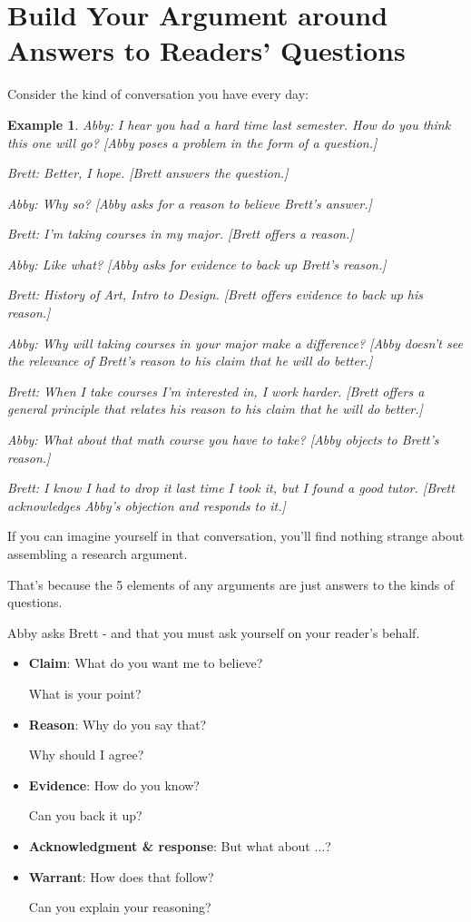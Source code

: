 \documentclass[oneside]{book}
\numberwithin{equation}{section}
\newtheorem{example}{Example}[section]
\begin{document}
\section{Build Your Argument around Answers to Readers' Questions}
Consider the kind of conversation you have every day:
\begin{example}
    Abby: I hear you had a hard time last semester. How do you think this one will go? \emph{[Abby poses a problem in the form of a question.]}
    
    Brett: Better, I hope. \emph{[Brett answers the question.]}
    
    Abby: Why so? \emph{[Abby asks for a reason to believe Brett's answer.]}
    
    Brett: I'm taking courses in my major. \emph{[Brett offers a reason.]}
    
    Abby: Like what? \emph{[Abby asks for evidence to back up Brett's reason.]}
    
    Brett: History of Art, Intro to Design. \emph{[Brett offers evidence to back up his reason.]}
    
    Abby: Why will taking courses in your major make a difference? \emph{[Abby doesn't see the relevance of Brett's reason to his claim that he will do better.]}
    
    Brett: When I take courses I'm interested in, I work harder. \emph{[Brett offers a general principle that relates his reason to his claim that he will do better.]}
    
    Abby: What about that math course you have to take? \emph{[Abby objects to Brett's reason.]}
    
    Brett: I know I had to drop it last time I took it, but I found a good tutor. \emph{[Brett acknowledges Abby's objection and responds to it.]}
\end{example}
If you can imagine yourself in that conversation, you'll find nothing strange about assembling a research argument.

That's because the 5 elements of any arguments are just answers to the kinds of questions.

Abby asks Brett - and that you must ask yourself on your reader's behalf.
\begin{itemize}
    \item \textbf{Claim}: What do you want me to believe?
    
    What is your point?
    \item \textbf{Reason}: Why do you say that?
    
    Why should I agree?
    \item \textbf{Evidence}: How do you know?
    
    Can you back it up?
    \item \textbf{Acknowledgment \& response}: But what about $\ldots$?
    \item \textbf{Warrant}: How does that follow?
    
    Can you explain your reasoning?
\end{itemize}
\end{document}
